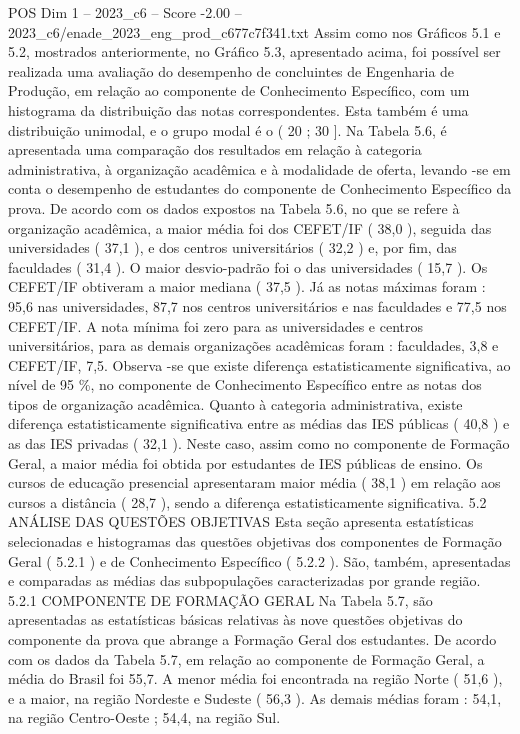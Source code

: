 \begin{textsample}{POS Dim 1 – 2023\_c6 – Score -2.00 – 2023\_c6/enade\_2023\_eng\_prod\_c677c7f341.txt}
Assim como nos Gráficos 5.1 e 5.2, mostrados anteriormente, no Gráfico 5.3, apresentado acima, foi possível ser realizada uma avaliação do desempenho de concluintes de Engenharia de Produção, em relação ao componente de Conhecimento Específico, com um histograma da distribuição das notas correspondentes.
Esta também é uma distribuição unimodal, e o grupo modal é o ( 20 ; 30 ].
Na Tabela 5.6, é apresentada uma comparação dos resultados em relação à categoria administrativa, à organização acadêmica e à modalidade de oferta, levando -se em conta o desempenho de estudantes do componente de Conhecimento Específico da prova.
De acordo com os dados expostos na Tabela 5.6, no que se refere à organização acadêmica, a maior média foi dos CEFET/IF ( 38,0 ), seguida das universidades ( 37,1 ), e dos centros universitários ( 32,2 ) e, por fim, das faculdades ( 31,4 ).
O maior desvio-padrão foi o das universidades ( 15,7 ).
Os CEFET/IF obtiveram a maior mediana ( 37,5 ).
Já as notas máximas foram : 95,6 nas universidades, 87,7 nos centros universitários e nas faculdades e 77,5 nos CEFET/IF.
A nota mínima foi zero para as universidades e centros universitários, para as demais organizações acadêmicas foram : faculdades, 3,8 e CEFET/IF, 7,5.
Observa -se que existe diferença estatisticamente significativa, ao nível de 95 \%, no componente de Conhecimento Específico entre as notas dos tipos de organização acadêmica.
Quanto à categoria administrativa, existe diferença estatisticamente significativa entre as médias das IES públicas ( 40,8 ) e as das IES privadas ( 32,1 ).
Neste caso, assim como no componente de Formação Geral, a maior média foi obtida por estudantes de IES públicas de ensino.
Os cursos de educação presencial apresentaram maior média ( 38,1 ) em relação aos cursos a distância ( 28,7 ), sendo a diferença estatisticamente significativa. 5.2 ANÁLISE DAS QUESTÕES OBJETIVAS Esta seção apresenta estatísticas selecionadas e histogramas das questões objetivas dos componentes de Formação Geral ( 5.2.1 ) e de Conhecimento Específico ( 5.2.2 ).
São, também, apresentadas e comparadas as médias das subpopulações caracterizadas por grande região. 5.2.1 COMPONENTE DE FORMAÇÃO GERAL Na Tabela 5.7, são apresentadas as estatísticas básicas relativas às nove questões objetivas do componente da prova que abrange a Formação Geral dos estudantes.
De acordo com os dados da Tabela 5.7, em relação ao componente de Formação Geral, a média do Brasil foi 55,7.
A menor média foi encontrada na região Norte ( 51,6 ), e a maior, na região Nordeste e Sudeste ( 56,3 ).
As demais médias foram : 54,1, na região Centro-Oeste ; 54,4, na região Sul.

\end{textsample}
